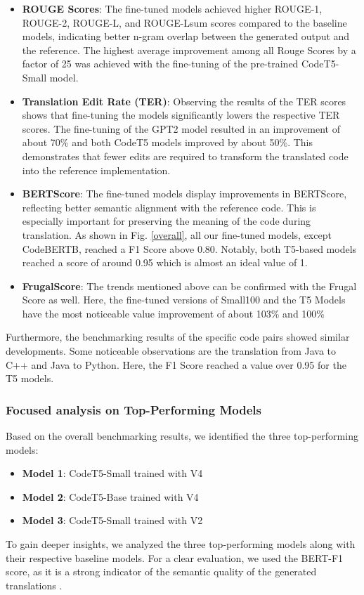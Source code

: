 \documentclass[conference]{IEEEtran}
\begin{document}
\begin{itemize}
    \item \textbf{ROUGE Scores}: The fine-tuned models achieved higher ROUGE-1, ROUGE-2, ROUGE-L, and ROUGE-Lsum scores compared to the baseline models, indicating better n-gram overlap between the generated output and the reference. The highest average improvement among all Rouge Scores by a factor of 25 was achieved with the fine-tuning of the pre-trained CodeT5-Small model.
    \item \textbf{Translation Edit Rate (TER)}: Observing the results of the TER scores shows that fine-tuning the models significantly lowers the respective TER scores. The fine-tuning of the GPT2 model resulted in an improvement of about 70\% and both CodeT5 models improved by about 50\%. This demonstrates that fewer edits are required to transform the translated code into the reference implementation.
    \item \textbf{BERTScore}: The fine-tuned models display improvements in BERTScore, reflecting better semantic alignment with the reference code. This is especially important for preserving the meaning of the code during translation. As shown in Fig. \ref{overall}, all our fine-tuned models, except CodeBERTB, reached a F1 Score above 0.80. Notably, both T5-based models reached a score of around 0.95 which is almost an ideal value of 1.
    \item \textbf{FrugalScore}:
    The trends mentioned above can be confirmed with the Frugal Score as well. Here, the fine-tuned versions of Small100 and the T5 Models have the most noticeable value improvement of about 103\% and 100\%
    \end{itemize}

Furthermore, the benchmarking results of the specific code pairs showed similar developments. Some noticeable observations are the translation from Java to C++ and Java to Python. Here, the F1 Score reached a value over 0.95 for the T5 models. 

\subsubsection{Focused analysis on Top-Performing Models}
Based on the overall benchmarking results, we identified the three top-performing models:
\begin{itemize}
    \item \textbf{Model 1}: CodeT5-Small trained with V4
    \item \textbf{Model 2}: CodeT5-Base trained with V4
    \item \textbf{Model 3}: CodeT5-Small trained with V2
\end{itemize}
To gain deeper insights, we analyzed the three top-performing models along with their respective baseline models. For a clear evaluation, we used the BERT-F1 score, as it is a strong indicator of the semantic quality of the generated translations \cite{b15}.
\end{document}
